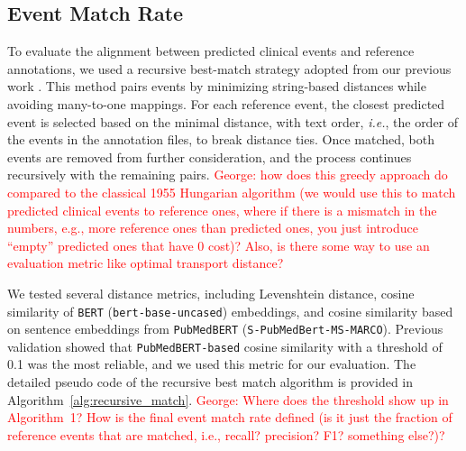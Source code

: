 \subsection{Event Match Rate}
To evaluate the alignment between predicted clinical events and reference annotations, we used a recursive best-match strategy adopted from our previous work \citep{wang2025large}. This method pairs events by minimizing string-based distances while avoiding many-to-one mappings. For each reference event, the closest predicted event is selected based on the minimal distance, with text order, \emph{i.e.}, the order of the events in the annotation files, to break distance ties. Once matched, both events are removed from further consideration, and the process continues recursively with the remaining pairs. \textcolor{red}{George: how does this greedy approach do compared to the classical 1955 Hungarian algorithm (we would use this to match predicted clinical events to reference ones, where if there is a mismatch in the numbers, e.g., more reference ones than predicted ones, you just introduce ``empty'' predicted ones that have 0 cost)? Also, is there some way to use an evaluation metric like optimal transport distance?}

We tested several distance metrics, including Levenshtein distance, cosine similarity of \texttt{BERT} (\texttt{bert-base-uncased}) embeddings, and cosine similarity based on sentence embeddings from \texttt{PubMedBERT} (\texttt{S-PubMedBert-MS-MARCO}). Previous validation showed that \texttt{PubMedBERT-based} cosine similarity with a threshold of 0.1 was the most reliable, and we used this metric for our evaluation. The detailed pseudo code of the recursive best match algorithm is provided in Algorithm~\ref{alg:recursive_match}. \textcolor{red}{George: Where does the threshold show up in Algorithm~1? How is the final event match rate defined (is it just the fraction of reference events that are matched, i.e., recall? precision? F1? something else?)?}


